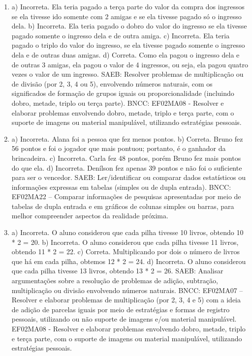 \begin{enumerate}
\item
a) Incorreta. Ela teria pagado a terça parte do valor da compra dos ingressos se ela
tivesse ido somente com 2 amigas e se ela tivesse pagado só o ingresso
dela.
b) Incorreta. Ela teria pagado o dobro do valor do ingresso se ela
tivesse pagado somente o ingresso dela e de outra amiga.
c) Incorreta. Ela teria pagado o triplo do valor do ingresso, se ela
tivesse pagado somente o ingresso dela e de outras duas amigas.
d) Correta. Como ela pagou o ingresso dela e de outras 3 amigas, ela
pagou o valor de 4 ingressos, ou seja, ela pagou quatro vezes o valor de um ingresso.
SAEB: Resolver problemas de multiplicação ou de divisão (por 2,
3, 4 ou 5), envolvendo números naturais, com os significados de formação
de grupos iguais ou proporcionalidade (incluindo dobro, metade, triplo
ou terça parte).
BNCC: EF02MA08 - Resolver e elaborar
problemas envolvendo dobro, metade, triplo e terça parte, com o suporte de imagens ou material manipulável, utilizando estratégias pessoais.

\item
a) Incorreta. Alana foi a pessoa que fez menos pontos.
b) Correta. Bruno fez 56 pontos e foi o jogador que mais pontuou;
portanto, é o ganhador da brincadeira.
c) Incorreta. Carla fez 48 pontos, porém Bruno fez mais pontos do que ela.
d) Incorreta. Denílson fez apenas 39 pontos e não foi o suficiente para ser o vencedor.
SAEB: Ler/identificar ou comparar dados estatísticos ou
informações expressas em tabelas (simples ou de dupla entrada).
BNCC: EF02MA22 -- Comparar informações de pesquisas apresentadas por meio
de tabelas de dupla entrada e em gráficos de colunas simples ou barras,
para melhor compreender aspectos da realidade próxima.

\item
a) Incorreta. O aluno considerou que cada pilha tivesse 10 livros, obtendo 10 * 2 = 20.
b) Incorreta. O aluno considerou que cada pilha tivesse 11 livros, obtendo 11 * 2 = 22.
c) Correta. Multiplicando por dois o número de livros que há em cada pilha, obtemos 12 * 2 = 24.
d) Incorreta. O aluno considerou que cada pilha tivesse 13 livros, obtendo 13 * 2 = 26.
SAEB: Analisar argumentações sobre a resolução de problemas de
adição, subtração, multiplicação ou divisão envolvendo números naturais.
BNCC: EF02MA07 -- Resolver e elaborar problemas de multiplicação (por 2,
3, 4 e 5) com a ideia de adição de parcelas iguais por meio de
estratégias e formas de registro pessoais, utilizando ou não suporte de
imagens e/ou material manipulável. EF02MA08 - Resolver e elaborar
problemas envolvendo dobro, metade, triplo e terça parte, com o suporte
de imagens ou material manipulável, utilizando estratégias pessoais.


\end{enumerate}
